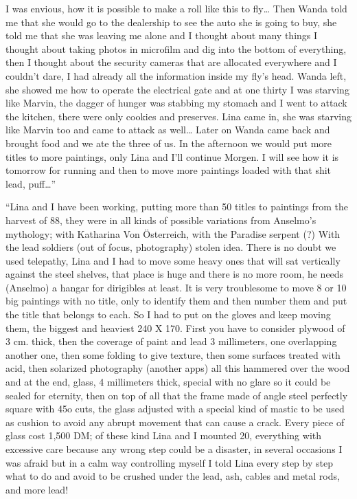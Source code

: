 \documentclass[smalldemyvopaper,11pt,twoside,onecolumn,openright,extrafontsizes]{memoir}
\begin{document}
I was envious, how it is possible to make a roll like this to fly… Then Wanda told me that she would go to the dealership to see the auto she is going to buy, she told me that she was leaving me alone and I thought about many things I thought about taking photos in microfilm and dig into the bottom of everything, then I thought about the security cameras that are allocated everywhere and I couldn’t dare, I had already all the information inside my fly’s head. Wanda left, she showed me how to operate the electrical gate and at one thirty I was starving like Marvin, the dagger of hunger was stabbing my stomach and I went to attack the kitchen, there were only cookies and preserves. Lina came in, she was starving like Marvin too and came to attack as well… Later on Wanda came back and brought food and we ate the three of us. In the afternoon we would put more titles to more paintings, only Lina and I’ll continue Morgen. I will see how it is tomorrow for running and then to move more paintings loaded with that shit lead, puff…”  

\ornamentbreak

“Lina and I have been working, putting more than 50 titles to paintings from the harvest of 88, they were in all kinds of possible variations from Anselmo’s mythology; with Katharina Von Österreich, with the Paradise serpent (?) With the lead soldiers (out of focus, photography) stolen idea. There is no doubt we used telepathy, Lina and I had to move some heavy ones that will sat vertically against the steel shelves, that place is huge and there is no more room, he needs (Anselmo) a hangar for dirigibles at least. It is very troublesome to move 8 or 10 big paintings with no title, only to identify them and then number them and put the title that belongs to each. So I had to put on the gloves and keep moving them, the biggest and heaviest 240 X 170. First you have to consider plywood of 3 cm. thick, then the coverage of paint and lead 3 millimeters, one overlapping another one, then some folding to give texture, then some surfaces treated with acid, then solarized photography (another apps) all this hammered over the wood and at the end, glass, 4 millimeters thick, special with no glare so it could be sealed for eternity, then on top of all that the frame made of angle steel perfectly square with 45o cuts, the glass adjusted with a special kind of mastic to be used as cushion to avoid any abrupt movement that can cause a crack. Every piece of glass cost 1,500 DM; of these kind Lina and I mounted 20, everything with excessive care because any wrong step could be a disaster, in several occasions I was afraid but in a calm way controlling myself I told Lina every step by step what to do and avoid to be crushed under the lead, ash, cables and metal rods, and more lead!
\end{document}

